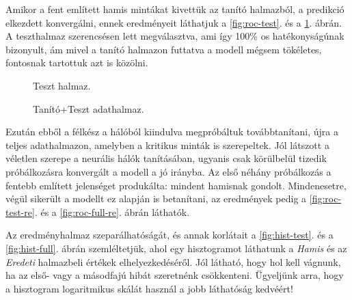 \label{sec:eredmenyek.100}
Amikor a fent említett hamis mintákat kivettük az tanító halmazból, a predikció elkezdett konvergálni,
ennek eredményeit láthatjuk a \ref{fig:roc-test}. és a \ref{fig:roc-full}. ábrán. A teszthalmaz szerencsésen
lett megválasztva, ami így 100\% os hatékonyságúnak bizonyult, ám mivel a tanító halmazon 
futtatva a modell mégsem tökéletes, fontosnak tartottuk azt is közölni. 



\begin{figure}[ht]
	

	\begin{minipage}[c]{0.5\linewidth}
		
		\caption{Teszt halmaz.}
		\label{fig:roc-test}

	\end{minipage}\hfill
	\begin{minipage}[c]{0.5\linewidth}
		
		\caption{Tanító+Teszt adathalmaz.}
		\label{fig:roc-full}
		
	\end{minipage}
\end{figure}


Ezután ebből a félkész a hálóból kiindulva megpróbáltuk továbbtanítani, újra a teljes adathalmazon,
amelyben a kritikus minták is szerepeltek. Jól látszott a véletlen szerepe a neurális 
hálók tanításában, ugyanis csak körülbelül tizedik próbálkozásra konvergált a modell a
jó irányba. Az első néhány próbálkozás a fentebb említett jelenséget produkálta: mindent 
hamisnak gondolt. Mindenesetre, végül sikerült a modellt ez alapján is betanítani, az 
eredmények pedig a \ref{fig:roc-test-re}. és a \ref{fig:roc-full-re}. ábrán láthatók.


Az eredményhalmaz szeparálhatóságát, és annak korlátait a \ref{fig:hist-test}. és a \ref{fig:hist-full}.
ábrán szemléltetjük, ahol egy hisztogramot láthatunk a \textit{Hamis} és az \textit{Eredeti}
halmazbeli értékek elhelyezkedéséről. Jól látható, hogy hol kell vágnunk, ha az 
első- vagy a másodfajú hibát szeretnénk csökkenteni. Ügyeljünk arra, hogy a hisztogram
logaritmikus skálát használ a jobb láthatóság kedvéért!


